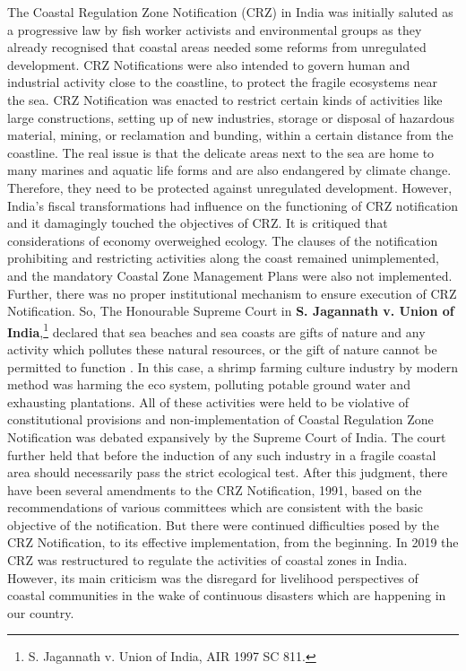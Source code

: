\begin{multicols}{2}
\noi
The Coastal Regulation Zone Notification (CRZ) in India was initially saluted as a
progressive law by fish worker activists and environmental groups as they already recognised
that coastal areas needed some reforms from unregulated development. CRZ Notifications
were also intended to govern human and industrial activity close to the coastline, to protect
the fragile ecosystems near the sea. CRZ Notification was enacted to restrict certain kinds of
activities like large constructions, setting up of new industries, storage or disposal of
hazardous material, mining, or reclamation and bunding, within a certain distance from the
coastline. The real issue is that the delicate areas next to the sea are home to many marines
and aquatic life forms and are also endangered by climate change. Therefore, they need to be
protected against unregulated development. However, India’s fiscal transformations had
influence on the functioning of CRZ notification and it damagingly touched the objectives of 
CRZ. It is critiqued that considerations of economy overweighed ecology. The clauses of the
notification prohibiting and restricting activities along the coast remained unimplemented,
and the mandatory Coastal Zone Management Plans were also not implemented. Further,
there was no proper institutional mechanism to ensure execution of CRZ Notification. So,
The Honourable Supreme Court in \textbf{S. Jagannath v. Union of India},\footnote{S. Jagannath v. Union of India, AIR 1997 SC 811.} declared that sea
beaches and sea coasts are gifts of nature and any activity which pollutes these natural
resources, or the gift of nature cannot be permitted to function . In this case, a shrimp farming
culture industry by modern method was harming the eco system, polluting potable ground
water and exhausting plantations. All of these activities were held to be violative of
constitutional provisions and non-implementation of Coastal Regulation Zone Notification
was debated expansively by the Supreme Court of India. The court further held that before
the induction of any such industry in a fragile coastal area should necessarily pass the strict
ecological test. After this judgment, there have been several amendments to the CRZ
Notification, 1991, based on the recommendations of various committees which are
consistent with the basic objective of the notification. But there were continued difficulties
posed by the CRZ Notification, to its effective implementation, from the beginning. In 2019
the CRZ was restructured to regulate the activities of coastal zones in India. However, its
main criticism was the disregard for livelihood perspectives of coastal communities in the
wake of continuous disasters which are happening in our country.


\end{multicols}
